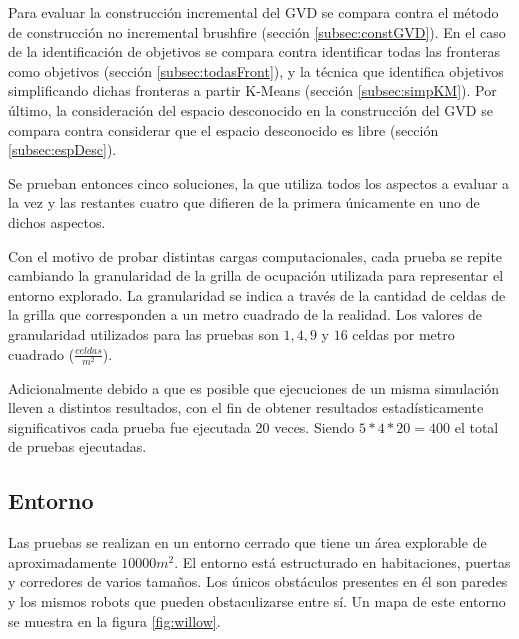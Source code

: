 Para evaluar la construcción incremental del GVD se compara contra el método de 
construcción no incremental brushfire (sección \ref{subsec:constGVD}). En el caso de la
identificación de objetivos se compara contra identificar todas las fronteras
como objetivos (sección \ref{subsec:todasFront}), y la técnica que identifica
objetivos simplificando dichas fronteras a partir K-Means (sección
\ref{subsec:simpKM}). Por último, la consideración del espacio desconocido en
la construcción del GVD se compara contra considerar que el espacio
desconocido es libre (sección \ref{subsec:espDesc}). 

Se prueban entonces cinco soluciones, la que utiliza todos los aspectos a
evaluar a la vez y las restantes cuatro que difieren de la primera únicamente
en uno de dichos aspectos.

Con el motivo de probar distintas cargas computacionales, cada prueba se repite
cambiando la granularidad de la grilla de ocupación utilizada para representar
el entorno explorado. La granularidad se indica a través de la cantidad de
celdas de la grilla que corresponden a un metro cuadrado de la realidad. Los
valores de granularidad utilizados para las pruebas son $1,4,9$ y $16$ celdas
por metro cuadrado ($\frac{celdas}{m^2}$). 

Adicionalmente debido a que es posible que ejecuciones de un misma simulación
lleven a distintos resultados, con el fin de obtener resultados
estadísticamente significativos cada prueba fue ejecutada 20 veces. Siendo 
$5*4*20=400$ el total de pruebas ejecutadas.


\subsection{Entorno}
Las pruebas se realizan en un entorno cerrado que tiene un área explorable de
aproximadamente $10000m^2$. El entorno está estructurado en habitaciones,
puertas y corredores de varios tamaños. Los únicos obstáculos presentes en él
son paredes y los mismos robots que pueden obstaculizarse entre
sí. Un mapa de este entorno se muestra en la figura
\ref{fig:willow}.

